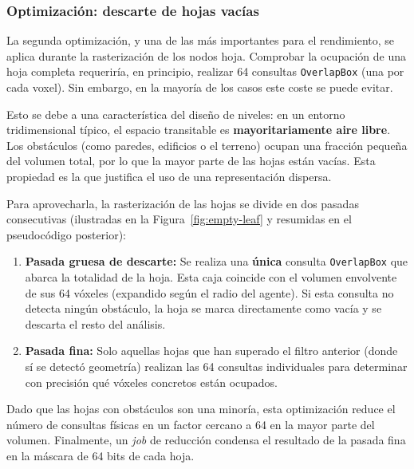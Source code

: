 \subsubsection{Optimización: descarte de hojas vacías}
\label{sec:descarte-hojas}

La segunda optimización, y una de las más importantes para el rendimiento, se aplica durante la rasterización de los nodos hoja.
Comprobar la ocupación de una hoja completa requeriría, en principio, realizar 64 consultas \texttt{OverlapBox} (una por cada \gls{voxel}).
Sin embargo, en la mayoría de los casos este coste se puede evitar.

Esto se debe a una característica del diseño de niveles: en un entorno tridimensional típico, el espacio transitable es \textbf{mayoritariamente aire libre}.
Los obstáculos (como paredes, edificios o el terreno) ocupan una fracción pequeña del volumen total, por lo que la mayor parte de las hojas están vacías.
Esta propiedad es la que justifica el uso de una representación dispersa.

Para aprovecharla, la rasterización de las hojas se divide en dos pasadas consecutivas (ilustradas en la Figura~\ref{fig:empty-leaf} y resumidas en el pseudocódigo posterior):

\begin{enumerate}
    \item \textbf{Pasada gruesa de descarte:} Se realiza una \textbf{única} consulta \texttt{OverlapBox} que abarca la totalidad de la hoja.
    Esta caja coincide con el volumen envolvente de sus 64 vóxeles (expandido según el radio del agente).
    Si esta consulta no detecta ningún obstáculo, la hoja se marca directamente como vacía y se descarta el resto del análisis.
    \item \textbf{Pasada fina:} Solo aquellas hojas que han superado el filtro anterior (donde sí se detectó geometría) realizan las 64 consultas individuales para determinar con precisión qué vóxeles concretos están ocupados.
\end{enumerate}

Dado que las hojas con obstáculos son una minoría, esta optimización reduce el número de consultas físicas en un factor cercano a 64 en la mayor parte del volumen.
Finalmente, un \textit{job} de reducción condensa el resultado de la pasada fina en la máscara de 64 bits de cada hoja.

